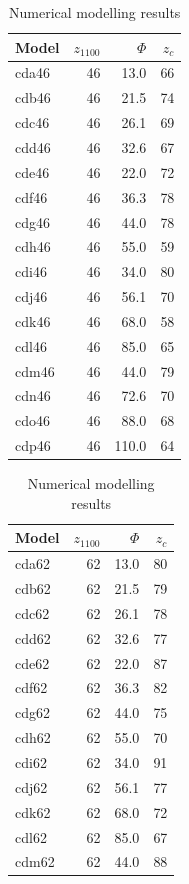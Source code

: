 \documentclass[draft,linenumbers]{agujournal2018}
\begin{document}
\begin{landscape}\begin{table}
\caption{\label{tab:zc.results}Numerical modelling results}

\centering
\fontsize{8}{10}\selectfont
\begin{tabular}[t]{lrrr}
\toprule
Model & $z_{1100}$ & $\Phi$ & $z_c$\\
\midrule
cda46 & 46 & 13.0 & 66\\
cdb46 & 46 & 21.5 & 74\\
cdc46 & 46 & 26.1 & 69\\
cdd46 & 46 & 32.6 & 67\\
cde46 & 46 & 22.0 & 72\\
\addlinespace
cdf46 & 46 & 36.3 & 78\\
cdg46 & 46 & 44.0 & 78\\
cdh46 & 46 & 55.0 & 59\\
cdi46 & 46 & 34.0 & 80\\
cdj46 & 46 & 56.1 & 70\\
\addlinespace
cdk46 & 46 & 68.0 & 58\\
cdl46 & 46 & 85.0 & 65\\
cdm46 & 46 & 44.0 & 79\\
cdn46 & 46 & 72.6 & 70\\
cdo46 & 46 & 88.0 & 68\\
\addlinespace
cdp46 & 46 & 110.0 & 64\\
\bottomrule
\end{tabular}
\centering
\begin{tabular}[t]{lrrr}
\toprule
Model & $z_{1100}$ & $\Phi$ & $z_c$\\
\midrule
cda62 & 62 & 13.0 & 80\\
cdb62 & 62 & 21.5 & 79\\
cdc62 & 62 & 26.1 & 78\\
cdd62 & 62 & 32.6 & 77\\
cde62 & 62 & 22.0 & 87\\
\addlinespace
cdf62 & 62 & 36.3 & 82\\
cdg62 & 62 & 44.0 & 75\\
cdh62 & 62 & 55.0 & 70\\
cdi62 & 62 & 34.0 & 91\\
cdj62 & 62 & 56.1 & 77\\
\addlinespace
cdk62 & 62 & 68.0 & 72\\
cdl62 & 62 & 85.0 & 67\\
cdm62 & 62 & 44.0 & 88\\

\end{tabular}
\end{table}
\end{landscape}
\end{document}
